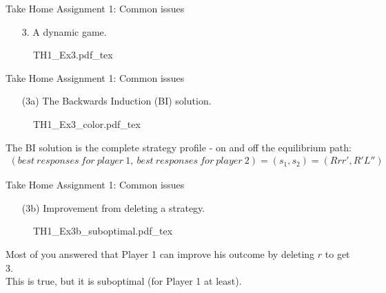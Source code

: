 \begin{frame}{Take Home Assignment 1: Common issues}
  \begin{itemize}
    \item[3.] A dynamic game.
  \end{itemize}
  \begin{figure}[!h]
    \begin{center}
    \def\svgwidth{\columnwidth}
    {TH1_Ex3.pdf_tex}
    \end{center}
  \end{figure}
\end{frame}
\begin{frame}{Take Home Assignment 1: Common issues}
  \begin{itemize}
    \item[(3a)] The Backwards Induction (BI) solution.
  \end{itemize}
  \begin{figure}[!h]
    \begin{center}
    \def\svgwidth{\columnwidth}
    {TH1_Ex3_color.pdf_tex}
    \end{center}
  \end{figure}
  The BI solution is the complete strategy profile - on and off the equilibrium path:
  \begin{align*}
    (best\ responses\ for\ player\ 1,\ best\ responses\ for\ player\ 2)=(s_1,s_2)=(Rrr',R'L'')
  \end{align*}
\end{frame}
\begin{frame}{Take Home Assignment 1: Common issues}
  \begin{itemize}
    \item[(3b)] Improvement from deleting a strategy.
  \end{itemize}
  \begin{figure}[!h]
    \begin{center}
    \def\svgwidth{\columnwidth}
    {TH1_Ex3b_suboptimal.pdf_tex}
    \end{center}
  \end{figure}
  Most of you answered that Player 1 can improve his outcome by deleting $r$ to get 3.\\\medskip
  This is true, but it is suboptimal (for Player 1 at least).
\end{frame}
